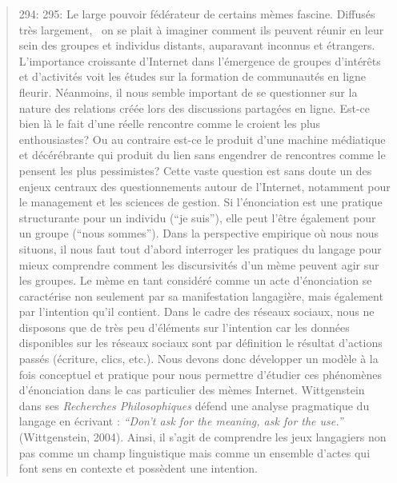 \begin{quote}
294: 
295: Le large pouvoir f\'ed\'erateur de certains m\`emes fascine. Diffus\'es tr\`es largement, \ on se plait \`a imaginer comment ils peuvent r\'eunir en leur sein des groupes et individus distants, auparavant inconnus et \'etrangers. L{\textquoteright}importance croissante d{\textquoteright}Internet dans l{\textquoteright}\'emergence de groupes d{\textquoteright}int\'er\^ets et d{\textquoteright}activit\'es voit les \'etudes sur la formation de communaut\'es en ligne fleurir. N\'eanmoins, il nous semble important de se questionner sur la nature des relations cr\'e\'ee lors des discussions partag\'ees en ligne. Est-ce bien l\`a le fait d{\textquoteright}une r\'eelle rencontre comme le croient les plus enthousiastes? Ou au contraire est-ce le produit d{\textquoteright}une machine m\'ediatique et d\'ec\'er\'ebrante qui produit du lien sans engendrer de rencontres comme le pensent les plus pessimistes? Cette vaste question est sans doute un des enjeux centraux des questionnements autour de l{\textquoteright}Internet, notamment pour le management et les sciences de gestion. Si l{\textquoteright}\'enonciation est une pratique structurante pour un individu ({\textquotedblleft}je suis{\textquotedblright}), elle peut l{\textquoteright}\^etre \'egalement pour un groupe ({\textquotedblleft}nous sommes{\textquotedblright}). Dans la perspective empirique o\`u nous nous situons, il nous faut tout d{\textquoteright}abord interroger les pratiques du langage pour mieux comprendre comment les discursivit\'es d{\textquoteright}un m\`eme peuvent agir sur les groupes. Le m\`eme en tant consid\'er\'e comme un acte d{\textquoteright}\'enonciation se caract\'erise non seulement par sa manifestation langagi\`ere, mais \'egalement par l{\textquoteright}intention qu{\textquoteright}il contient. Dans le cadre des r\'eseaux sociaux, nous ne disposons que de tr\`es peu d{\textquoteright}\'el\'ements sur l{\textquoteright}intention car les donn\'ees disponibles sur les r\'eseaux sociaux sont par d\'efinition le r\'esultat d{\textquoteright}actions pass\'es (\'ecriture, clics, etc.).\textit{ }Nous devons donc d\'evelopper un mod\`ele \`a la fois conceptuel et pratique pour nous permettre d{\textquoteright}\'etudier ces ph\'enom\`enes d{\textquoteright}\'enonciation dans le cas particulier des m\`emes Internet. Wittgenstein dans ses \textit{Recherches Philosophiques }d\'efend une analyse pragmatique du langage en \'ecrivant : \textit{{\textquotedblleft}Don{\textquoteright}t ask for the meaning, ask for the use.{\textquotedblright}} (Wittgenstein, 2004). Ainsi, il s{\textquoteright}agit de comprendre les jeux langagiers non pas comme un champ linguistique mais comme un ensemble d{\textquoteright}actes qui font sens en contexte et poss\`edent une intention. 

\end{quote}
